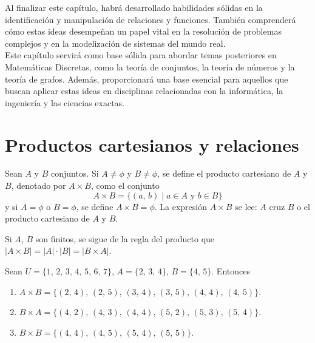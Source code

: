 Al finalizar este capítulo, habrá desarrollado habilidades sólidas en la identificación y manipulación de relaciones y funciones. También comprenderá cómo estas ideas desempeñan un papel vital en la resolución de problemas complejos y en la modelización de sistemas del mundo real.\\


Este capítulo servirá como base sólida para abordar temas posteriores en Matemáticas Discretas, como la teoría de conjuntos, la teoría de números y la teoría de grafos. Además, proporcionará una base esencial para aquellos que buscan aplicar estas ideas en disciplinas relacionadas con la informática, la ingeniería y las ciencias exactas.

\newpage

\section{Productos cartesianos y relaciones}

\begin{definicion}{}{}
    Sean $A$ y $B$ conjuntos. Si $A \neq \phi$ y $B \neq \phi$, se define el producto cartesiano de $A$ y $B$, denotado por $A \times B$, como el conjunto
    $$A \times B = \{(a, \, b) \mid a \in A \text { y } b \in B\}$$
    y si $A = \phi$ o $B = \phi$, se define $A \times B = \phi$. La expresión $A \times B$ se lee: $A$ cruz $B$ o el producto cartesiano de $A$ y $B$.
\end{definicion}

\begin{BOX}
    Si $A$, $B$ son finitos, se sigue de la regla del producto que $|A \times B| = |A| \cdot |B| = |B \times A|$.
\end{BOX}

\begin{myexample}
    Sean $U = \{ 1, \, 2, \, 3, \, 4, \, 5, \, 6, \, 7 \}$, $A = \{ 2, \, 3, \, 4 \}$, $B = \{ 4, \, 5 \}$. Entonces
    \begin{enumerate}[label=\alph*)]
        \item $A \times B = \{ (2, \, 4), \, (2, \, 5), \, (3, \, 4), \, (3, \, 5), \, (4, \, 4), \, (4, \, 5) \}$.
        \item $B \times A = \{ (4, \, 2), \, (4, \, 3), \, (4, \, 4), \, (5, \, 2), \, (5, \, 3), \, (5, \, 4) \}$.
        \item $B \times B = \{ (4, \, 4), \, (4, \, 5), \, (5, \, 4), \, (5, \, 5) \}$.
    \end{enumerate}
\end{myexample}


